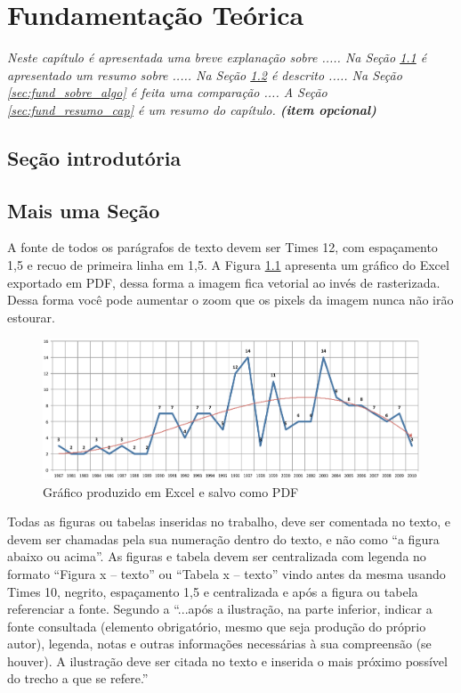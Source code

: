 \chapter{Fundamentação Teórica}
\begin{flushright}
	\begin{minipage}{14.0cm}
			\setlength{\parindent}{0cm}
			\textit{Neste capítulo é apresentada uma breve explanação sobre ..... Na Seção \ref{sec:fund_introdutoria} é apresentado um resumo sobre ..... Na Seção \ref{sec:fund_mais_uma} é descrito ..... Na Seção \ref{sec:fund_sobre_algo} é feita uma comparação .... A Seção \ref{sec:fund_resumo_cap} é um resumo do capítulo. \textbf{(item opcional)}}
	\end{minipage}
\end{flushright}


\section{Seção introdutória}\label{sec:fund_introdutoria}
\lipsum[1]
\section{Mais uma Seção}\label{sec:fund_mais_uma}
A fonte de todos os parágrafos de texto devem ser Times 12, com espaçamento 1,5 e recuo de primeira linha em 1,5. A Figura \ref{fig:grafico_excel} apresenta um gráfico do Excel exportado em PDF, dessa forma a imagem fica vetorial ao invés de rasterizada. Dessa forma você pode aumentar o zoom que os pixels da imagem nunca não irão estourar.

\begin{figure}[htb]
	\centering
	\setlength{\captionmargin}{-40pt}
	\caption{Gráfico produzido em Excel e salvo como PDF}\label{fig:grafico_excel}
    \includegraphics[scale=0.5]{imagens/abntex2-modelo-img-grafico.pdf}
\end{figure}

Todas as figuras ou tabelas inseridas no trabalho, deve ser comentada no texto, e devem ser chamadas pela sua numeração dentro do texto, e não como ``a figura abaixo ou acima''. As figuras e tabela devem ser centralizada com legenda no formato ``Figura x – texto'' ou ``Tabela x – texto'' vindo antes da mesma usando Times 10, negrito, espaçamento 1,5 e centralizada e após a figura ou tabela referenciar a fonte. Segundo a \cite{NBR14724:2011} ``...após a ilustração, na parte inferior, indicar a fonte consultada (elemento obrigatório, mesmo que seja produção do próprio autor), legenda, notas e outras informações necessárias à sua compreensão (se houver). A ilustração deve ser citada no texto e inserida o mais próximo possível do trecho a que se refere.''
